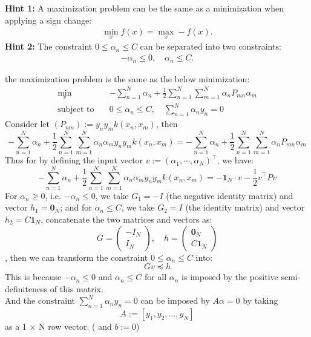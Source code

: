 \documentclass[lang=cn,11pt]{elegantbook}
\begin{document}
\textbf{Hint 1:} A maximization problem can be the same as a minimization when applying a sign change:
\begin{align}
\min_x f(x) = \max_x -f(x).
\end{align}
\textbf{Hint 2:} The constraint $0 \leq \alpha_n \leq C$ can be separated into two constraints:
\begin{align}
-\alpha_n \leq 0, \quad \alpha_n \leq C.
\end{align}
\begin{solution}
the maximization problem is the same as the below minimization:
\begin{align}
\min_{v} \quad & -\sum_{n=1}^{N} \alpha_n + \frac{1}{2} \sum_{n=1}^{N} \sum_{m=1}^{N} \alpha_n P_{mn} \alpha_m  \\
\text{subject to} \quad & 0 \leq \alpha_n \leq C, \quad \sum_{n=1}^{N} \alpha_n y_n = 0
\end{align}
    Consider let $(P_{nm}) := y_n y_m k(x_n, x_m)$, then \[
-\sum_{n=1}^{N} \alpha_n + \frac{1}{2} \sum_{n=1}^{N} \sum_{m=1}^{N} \alpha_n \alpha_m y_n y_m k(x_n, x_m)  = -\sum_{n=1}^{N} \alpha_n + \frac{1}{2} \sum_{n=1}^{N} \sum_{m=1}^{N} \alpha_n P_{mn} \alpha_m 
    \]
Thus for by defining the input vector $v:= (\alpha_1, \cdots, \alpha_N)^\top $, we have: \[
-\sum_{n=1}^{N} \alpha_n + \frac{1}{2} \sum_{n=1}^{N} \sum_{m=1}^{N} \alpha_n \alpha_m y_n y_m k(x_n, x_m)   = \mathbf{-1}_N\cdot v - \frac{1}{2}v^\top P  v
\]
For \(\alpha_n \ge 0\), i.e. \(-\alpha_n \le 0\), we take \(G_1 = -I\) (the negative identity matrix) and vector \(h_1 = \mathbf{0}_N\); and for \(\alpha_n \le C\), we take \(G_2 = I\) (the identity matrix) and vector \(h_2 = C\mathbf{1}_N\), concatenate the two matrices and vectors as:
\[
  G = \begin{pmatrix} -I_N \\ I_N \end{pmatrix},\quad   h = \begin{pmatrix} \mathbf{0}_N \\ C\mathbf{1}_N \end{pmatrix}
  \], then we can transform the constraint \( 0 \leq \alpha_n \leq C\) into: \[
Gv  \preceq h
\]
This is because \(-\alpha_n \le 0\) and \(\alpha_n \le C\) for all $\alpha_n$ is imposed by the positive semi-definiteness of this matrix.\\
And the constraint \(   \sum_{n=1}^{N} \alpha_n y_n = 0\) can be imposed by  \(  A\alpha = 0\) by taking  \[
   A := [y_1, y_2, \dots, y_N]
   \]
as a 1 \(\times\) N row vector. ( and  \(b := 0\))


\end{solution}
\end{document}

